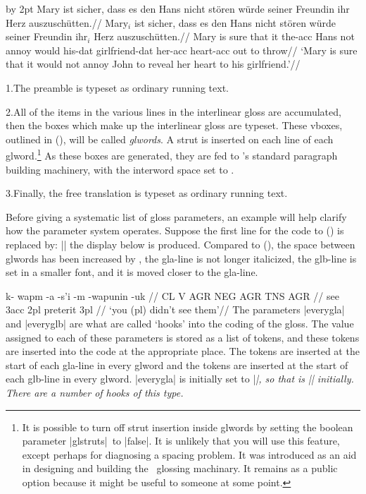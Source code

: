 \begingroup
\advance\hsize by 2pt
\framedisplay
\boxglwords
\ex[glspace=1.2em,extraglskip=1ex,belowpreambleskip=2ex,aboveglftskip=2ex]
\begingl
\glpreamble Mary ist sicher, dass es den Hans nicht st\"oren w\"urde
seiner Freundin ihr Herz auszusch\"utten.//
\gla Mary$_i$ ist sicher, dass es den Hans nicht st\"oren w\"urde
seiner Freundin ihr$_i$ Herz auszusch\"utten.//
\glb Mary is sure that it the-{\sc acc} Hans not annoy would
his-{\sc dat} girlfriend-{\sc dat} her-{\sc acc} heart-{\sc acc} {out to
throw}//
\glft  `Mary is sure that it would not annoy John to reveal her
heart to his girlfriend.'//
\endgl
\xe
\endframedisplay
\endgroup

\smallskip
\item{1.}The preamble is typeset as ordinary running text.
\item{2.}All of the items in the various lines in the interlinear gloss are
accumulated, then the boxes which make up the interlinear gloss are
typeset.  These vboxes, outlined in (\lastx), will be called {\it
glwords}. A strut is inserted on each line of each glword.\footnote{It
is possible to turn off strut insertion inside glwords by setting the
boolean parameter |glstruts|\ to |false|.
It is unlikely that you will use this feature, except perhaps for
diagnosing a spacing problem.  It was introduced as an aid in
designing and building the \ExPex\ glossing machinary.  It remains
as a public option because it might be useful to someone at some
point.} As these boxes are generated, they are fed to \Tex's standard
paragraph building machinery, with the interword space set to
. \item{3.}Finally, the free translation is typeset
as ordinary running text.
\medskip

Before giving a systematic list of gloss parameters, an example
will help clarify how the parameter system operates.  Suppose the
first line for the code to () is replaced by:
\medskip
\noindent |\ex[glspace=!1em,everygla={},everyglb=\footnotesize,aboveglbskip=-.2ex]|
\medskip
\noindent the display below is produced.  Compared to
(), the space between glwords has been increased by
\textdim{1 em}, the gla-line is not longer italicized, the glb-line is
set in a smaller font, and it is moved closer to the gla-line.

\framedisplay
{}
\begingl
\gla k- wapm -a -s'i -m -wapunin -uk //
\glb CL V AGR NEG AGR TNS AGR //
 see {\sc 3acc} {} {\sc 2pl} preterit {\sc 3pl} //
\glft `you (pl) didn't see them'//
\endgl
\xe
\endframedisplay
The parameters |everygla| and |everyglb| are what are called `hooks'
into the coding of the gloss.  The value assigned to each of these
parameters is stored as a list of tokens, and these tokens are
inserted into the code at the appropriate place.  The tokens
 are inserted at the start of each gla-line in
every glword and the tokens  are inserted at the
start of each glb-line in every glword.  |everygla| is initially set
to |\it|, so that  is |{\it}| initially.  There are a
number of hooks of this type.


